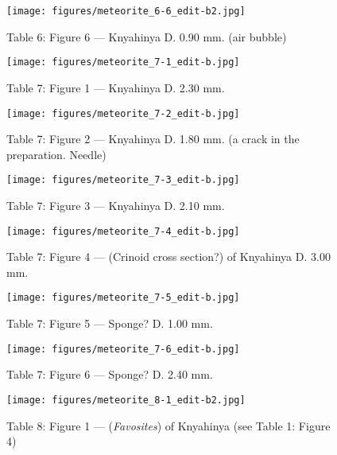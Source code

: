 \documentclass[a4paper, 12pt, oneside]{article}
\begin{document}
\clearpage
\begin{figure}[t]
\texttt{[image: figures/meteorite\_6-6\_edit-b2.jpg]}
\caption{Table 6: Figure 6 --- Knyahinya D. 0.90 mm. (air bubble)}
\centering
\end{figure}
\clearpage
{}
\begin{figure}[t]
\texttt{[image: figures/meteorite\_7-1\_edit-b.jpg]}
\caption{Table 7: Figure 1 --- Knyahinya D. 2.30 mm.}
\centering
\end{figure}
\clearpage
\begin{figure}[t]
\texttt{[image: figures/meteorite\_7-2\_edit-b.jpg]}
\caption{Table 7: Figure 2 --- Knyahinya D. 1.80 mm. (a crack in the preparation. Needle)}
\centering
\end{figure}
\clearpage
\begin{figure}[t]
\texttt{[image: figures/meteorite\_7-3\_edit-b.jpg]}
\caption{Table 7: Figure 3 --- Knyahinya D. 2.10 mm.}
\centering
\end{figure}
\clearpage
\begin{figure}[t]
\texttt{[image: figures/meteorite\_7-4\_edit-b.jpg]}
\caption{Table 7: Figure 4 --- (Crinoid cross section?) of Knyahinya D. 3.00 mm.}
\centering
\end{figure}
\clearpage
\begin{figure}[t]
\texttt{[image: figures/meteorite\_7-5\_edit-b.jpg]}
\caption{Table 7: Figure 5 --- Sponge? D. 1.00 mm.}
\centering
\end{figure}
\clearpage
\begin{figure}[t]
\texttt{[image: figures/meteorite\_7-6\_edit-b.jpg]}
\caption{Table 7: Figure 6 --- Sponge? D. 2.40 mm.}
\centering
\end{figure}
\clearpage
{}
\begin{figure}[t]
\texttt{[image: figures/meteorite\_8-1\_edit-b2.jpg]}
\caption{Table 8: Figure 1 --- (\emph{Favosites}) of Knyahinya (see Table 1: Figure 4)}
\centering
\end{figure}
\end{document}
